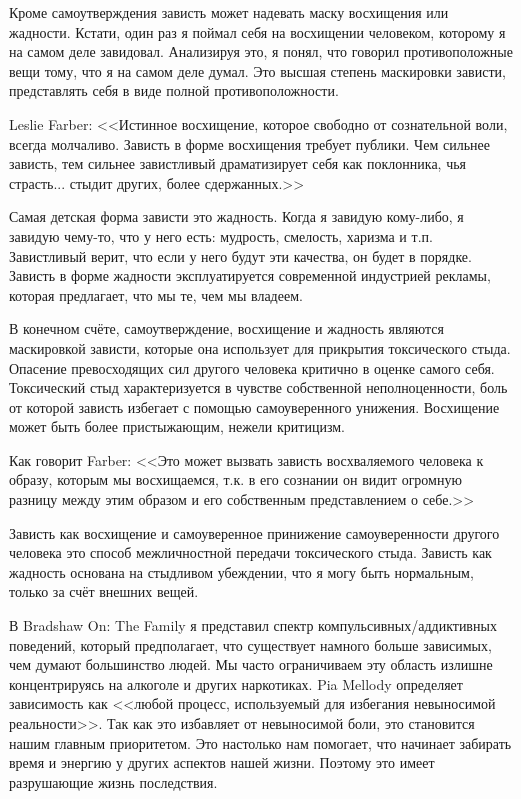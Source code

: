 \documentclass[10pt, fleqn]{article}
\begin{document}
Кроме самоутверждения зависть может надевать маску восхищения или жадности. Кстати, один раз я поймал себя на восхищении человеком, которому я на самом деле завидовал. Анализируя это, я понял, что говорил противоположные вещи тому, что я на самом деле думал. Это высшая степень маскировки зависти, представлять себя в виде полной противоположности.

Leslie Farber: <<Истинное восхищение, которое свободно от сознательной воли, всегда молчаливо. Зависть в форме восхищения требует публики. Чем сильнее зависть, тем сильнее завистливый драматизирует себя как поклонника, чья страсть... стыдит других, более сдержанных.>>

Самая детская форма зависти это жадность. Когда я завидую кому-либо, я завидую чему-то, что у него есть: мудрость, смелость, харизма и т.п. Завистливый верит, что если у него будут эти качества, он будет в порядке. Зависть в форме жадности эксплуатируется современной индустрией рекламы, которая предлагает, что мы те, чем мы владеем.

В конечном счёте, самоутверждение, восхищение и жадность являются маскировкой зависти, которые она использует для прикрытия токсического стыда. Опасение превосходящих сил другого человека критично в оценке самого себя. Токсический стыд характеризуется в чувстве собственной неполноценности, боль от которой зависть избегает с помощью самоуверенного унижения. Восхищение может быть более пристыжающим, нежели критицизм.

Как говорит Farber: <<Это может вызвать зависть восхваляемого человека к образу, которым мы восхищаемся, т.к. в его сознании он видит огромную разницу между этим образом и его собственным представлением о себе.>>

Зависть как восхищение и самоуверенное принижение самоуверенности другого человека это способ межличностной передачи токсического стыда. Зависть как жадность основана на стыдливом убеждении, что я могу быть нормальным, только за счёт внешних вещей.


В Bradshaw On: The Family я представил спектр компульсивных/аддиктивных поведений, который предполагает, что существует намного больше зависимых, чем думают большинство людей. Мы часто ограничиваем эту область излишне концентрируясь на алкоголе и других наркотиках. Pia Mellody определяет зависимость как <<любой процесс, используемый для избегания невыносимой реальности>>. Так как это избавляет от невыносимой боли, это становится нашим главным приоритетом. Это настолько нам помогает, что начинает забирать время и энергию у других аспектов нашей жизни. Поэтому это имеет разрушающие жизнь последствия.
\end{document}
